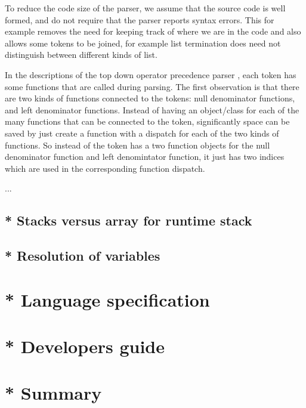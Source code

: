 To reduce the code size of the parser, we assume that the source code is well formed, and do not require that the parser reports syntax errors. This for example removes the need for keeping track of where we are in the code and also allows some tokens to be joined, for example list termination does need not distinguish between different kinds of list.

In the descriptions of the top down operator precedence parser \cite{tdop,beautifulcode}, each token has some functions that are called during parsing. 
The first observation is that there are two kinds of functions connected to the tokens: null denominator functions, and left denominator functions. 
Instead of having an object/class for each of the many functions that can be connected to the token, significantly space can be saved by just create a function with a dispatch for each of the two kinds of functions.
So instead of the token has a two function objects for the null denominator function and left denomintator function, it just has two indices which are used in the corresponding function dispatch.

...


\subsection{* Stacks versus array for runtime stack}
\subsection{* Resolution of variables}
\section{* Language specification}
\section{* Developers guide}
\section{* Summary}

